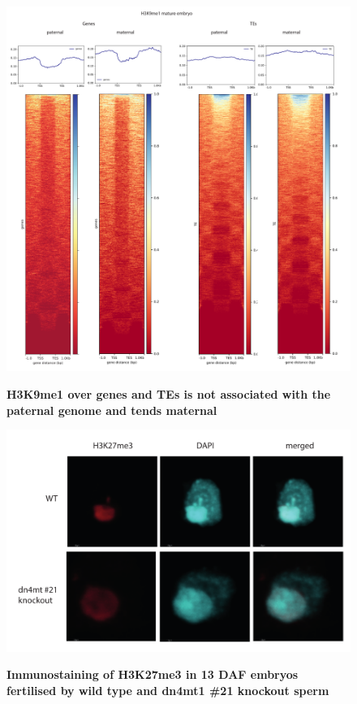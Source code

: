 \begin{figure}[htbp!] 
\centering    
    \includegraphics[width=1\textwidth]{Chapter3/Figs/Supps/FigureS5_H3k9me1.pdf}
\caption{\textbf{H3K9me1 over genes and TEs is not associated with the paternal genome and tends maternal}}
\label{fig:h3k8me1}
\captionsetup{font=small}
    \caption*{}
\end{figure}

\begin{figure}[htbp!] 
\centering    
    \includegraphics[width=1\textwidth]{Chapter3/Figs/Supps/FigureS1_immunostaining.pdf}
\caption{\textbf{Immunostaining of H3K27me3 in 13 DAF embryos fertilised by wild type and dn4mt1 \#21 knockout sperm }}
\label{fig:immuno}
\captionsetup{font=small}
    \caption*{}
\end{figure}

